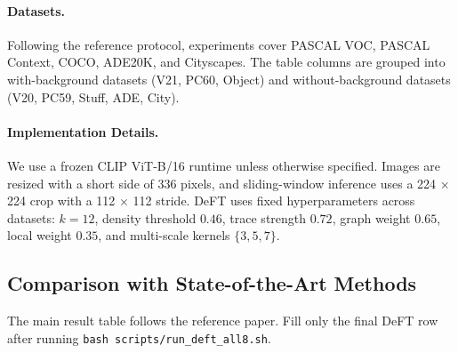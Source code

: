 \documentclass[letterpaper]{article}
\begin{document}
\paragraph{Datasets.}
Following the reference protocol, experiments cover PASCAL VOC, PASCAL
Context, COCO, ADE20K, and Cityscapes. The table columns are grouped into
with-background datasets (V21, PC60, Object) and without-background datasets
(V20, PC59, Stuff, ADE, City).

\paragraph{Implementation Details.}
We use a frozen CLIP ViT-B/16 runtime unless otherwise specified. Images are
resized with a short side of 336 pixels, and sliding-window inference uses a
224 $\times$ 224 crop with a 112 $\times$ 112 stride. DeFT uses fixed
hyperparameters across datasets: $k=12$, density threshold $0.46$, trace
strength $0.72$, graph weight $0.65$, local weight $0.35$, and multi-scale
kernels $\{3,5,7\}$.

\subsection{Comparison with State-of-the-Art Methods}

The main result table follows the reference paper. Fill only the final DeFT
row after running \texttt{bash scripts/run\_deft\_all8.sh}.
\end{document}
